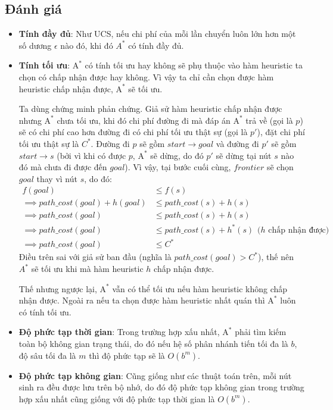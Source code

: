 \subsection{Đánh giá}
\begin{itemize}
    \item \textbf{Tính đầy đủ}: Như UCS, nếu chi phí của mỗi lần chuyển luôn lớn hơn một số dương $\epsilon$ nào đó, khi đó $A^*$ có tính đầy đủ.
    
    \item \textbf{Tính tối ưu}: $\text{A}^*$ có tính tối ưu hay không sẽ phụ thuộc vào hàm heuristic ta chọn có chấp nhận được hay không. Vì vậy ta chỉ cần chọn được hàm heuristic chấp nhận được, $\text{A}^*$ sẽ tối ưu. 
    \begin{proofvn}
        Ta dùng chứng minh phản chứng. Giả sử hàm heuristic chấp nhận được nhưng $\text{A}^*$ chưa tối ưu, khi đó chi phí đường đi mà đáp án $\text{A}^*$ trả về (gọi là $p$) sẽ có chi phí cao hơn đường đi có chi phí tối ưu thật sự (gọi là $p'$), đặt chi phí tối ưu thật sự là $C^*$. Đường đi $p$ sẽ gồm $start \rightarrow goal$ và đường đi $p'$ sẽ gồm $start \rightarrow s$ (bởi vì khi có được $p$, $\text{A}^*$ sẽ dừng, do đó $p'$ sẽ dừng tại nút $s$ nào đó mà chưa đi được đến $goal$). Vì vậy, tại bước cuối cùng, $frontier$ sẽ chọn $goal$ thay vì nút $s$, do đó:
        \begin{align*}
        f(goal) &\leq f(s) \\
        \implies path\_cost(goal) + h(goal) &\leq path\_cost(s) + h(s) \\
        \implies path\_cost(goal) &\leq path\_cost(s) + h(s) \\
        \implies path\_cost(goal) &\leq path\_cost(s) + h^*(s) \hspace{5pt} \text{($h$ chấp nhận được)} \\
        \implies path\_cost(goal) &\leq C^*
        \end{align*}
        Điều trên sai với giả sử ban đầu (nghĩa là $path\_cost(goal) > C^*$), thế nên $A^*$ sẽ tối ưu khi mà hàm heuristic $h$ chấp nhận được.
    \end{proofvn}
    Thế nhưng ngược lại, $\text{A}^*$ vẫn có thể tối ưu nếu hàm heuristic không chấp nhận được. Ngoài ra nếu ta chọn được hàm heuristic nhất quán thì $\text{A}^*$ luôn có tính tối ưu.
    
    \item \textbf{Độ phức tạp thời gian}: Trong trường hợp xấu nhất, $\text{A}^*$ phải tìm kiếm toàn bộ không gian trạng thái, do đó nếu hệ số phân nhánh tiến tối đa là $b$, độ sâu tối đa là $m$ thì độ phức tạp sẽ là $O(b^m)$.
    
    \item \textbf{Độ phức tạp không gian}: Cũng giống như các thuật toán trên, mỗi nút sinh ra đều được lưu trên bộ nhớ, do đó độ phức tạp không gian trong trường hợp xấu nhất cũng giống với độ phức tạp thời gian là $O(b^m)$.
\end{itemize}

